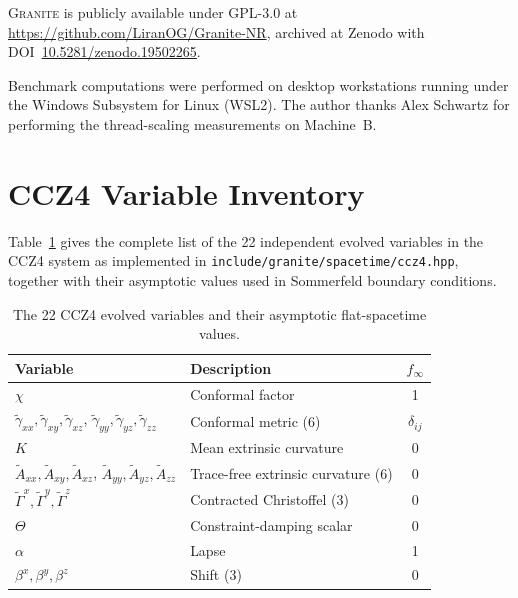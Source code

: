 \documentclass[aps,prd,twocolumn,superscriptaddress,nofootinbib,showpacs,
               longbibliography]{revtex4-2}
\newcommand{\granite}{\textsc{Granite}}
\newcommand{\code}[1]{\texttt{#1}}
\begin{document}
\granite{} is publicly available under GPL-3.0 at
\url{https://github.com/LiranOG/Granite-NR}, archived at Zenodo with
DOI~\href{https://doi.org/10.5281/zenodo.19502265}{10.5281/zenodo.19502265}.

\begin{acknowledgments}
Benchmark computations were performed on desktop workstations running under
the Windows Subsystem for Linux (WSL2).
The author thanks Alex Schwartz for performing the thread-scaling
measurements on Machine~B.
\end{acknowledgments}

\appendix
\section{CCZ4 Variable Inventory}
\label{app:ccz4_vars}

Table~\ref{tab:ccz4_vars} gives the complete list of the 22 independent
evolved variables in the CCZ4 system as implemented in
\code{include/granite/spacetime/ccz4.hpp}, together with their asymptotic
values used in Sommerfeld boundary conditions.

\begin{table}[h]
\caption{The 22 CCZ4 evolved variables and their asymptotic flat-spacetime values.}
\label{tab:ccz4_vars}
\begin{ruledtabular}
\begin{tabular}{llc}
  Variable & Description & $f_\infty$ \\ \hline
  $\chi$ & Conformal factor & 1 \\
  $\tilde\gamma_{xx}, \tilde\gamma_{xy}, \tilde\gamma_{xz}$,
  $\tilde\gamma_{yy}, \tilde\gamma_{yz}, \tilde\gamma_{zz}$
    & Conformal metric (6) & $\delta_{ij}$ \\
  $K$ & Mean extrinsic curvature & 0 \\
  $\tilde A_{xx}, \tilde A_{xy}, \tilde A_{xz}$,
  $\tilde A_{yy}, \tilde A_{yz}, \tilde A_{zz}$
    & Trace-free extrinsic curvature (6) & 0 \\
  $\tilde\Gamma^x, \tilde\Gamma^y, \tilde\Gamma^z$
    & Contracted Christoffel (3) & 0 \\
  $\Theta$ & Constraint-damping scalar & 0 \\
  $\alpha$ & Lapse & 1 \\
  $\beta^x, \beta^y, \beta^z$ & Shift (3) & 0 \\
\end{tabular}
\end{ruledtabular}
\end{table}
\end{document}
